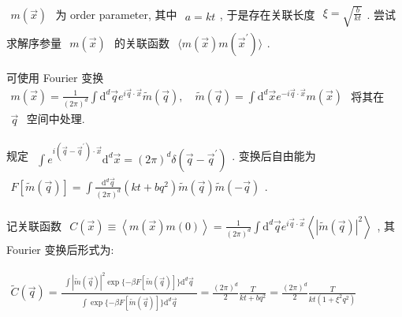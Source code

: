 \documentclass[../../main.tex]{subfiles}
\begin{document}
$\begin{aligned}
    m\left(\vec{x}\right)
\end{aligned}$ 为 order parameter, 其中 $\begin{aligned}
    a = kt
\end{aligned}$, 于是存在关联长度 $\begin{aligned}
    \xi = \sqrt{\frac{b}{kt}}
\end{aligned}$. 尝试求解序参量 $\begin{aligned}
    m\left(\vec{x}\right)
\end{aligned}$ 的关联函数 $\begin{aligned}
    \langle m\left(\vec{x}\right)m\left(\vec{x}^{\prime}\right)\rangle
\end{aligned}$. 

可使用 Fourier 变换 $\begin{aligned}
    m\left(\vec{x}\right) = \frac{1}{(2\pi)^{d}}\int\mathrm{d}^{d}\vec{q}e^{i\vec{q}\cdot\vec{x}}\widetilde{m}\left(\vec{q}\right),\quad \widetilde{m}\left(\vec{q}\right) = \int\mathrm{d}^{d}\vec{x}e^{-i\vec{q}\cdot\vec{x}}m\left(\vec{x}\right)
\end{aligned}$ 将其在 $\begin{aligned}
    \vec{q}
\end{aligned}$ 空间中处理. 

规定 $\begin{aligned}
    \int e^{i\left(\vec{q}-\vec{q}^{\prime}\right)\cdot\vec{x}}\mathrm{d}^{d}\vec{x} = (2\pi)^{d}\delta(\vec{q}-\vec{q}^{\prime})
\end{aligned}$. 变换后自由能为 $\begin{aligned}
    F\left[\widetilde{m}\left(\vec{q}\right)\right] = \int\frac{\mathrm{d}^{d}\vec{q}}{(2\pi)^{d}} \left(kt + bq^{2}\right)\widetilde{m}\left(\vec{q}\right)\widetilde{m}\left(-\vec{q}\right)
\end{aligned}$. 

记关联函数 $\begin{aligned}
    C\left(\vec{x}\right) \equiv \left\langle m\left(\vec{x}\right)m(0)\right\rangle = \frac{1}{(2\pi)^{d}}\int\mathrm{d}^{d}\vec{q}e^{i\vec{q}\cdot\vec{x}}\left\langle\left|
        \widetilde{m}\left(\vec{q}\right)
    \right|^{2}\right\rangle
\end{aligned}$, 其 Fourier 变换后形式为: 

$\begin{aligned}
    \widetilde{C}\left(\vec{q}\right) = \frac{\begin{aligned}
        \int\left|\widetilde{m}\left(\vec{q}\right)\right|^{2}\exp{\{-\beta F\left[\widetilde{m}\left(\vec{q}\right)\right]\}}\mathrm{d}^{d}\vec{q}
    \end{aligned}}{\begin{aligned}
        \int \exp{\{-\beta F\left[\widetilde{m}\left(\vec{q}\right)\right]\}}\mathrm{d}^{d}\vec{q}
    \end{aligned}} = \frac{(2\pi)^{d}}{2}\frac{T}{kt+bq^{2}} = \frac{(2\pi)^{d}}{2}\frac{T}{kt(1+\xi^{2}q^{2})}
\end{aligned}$
\end{document}

